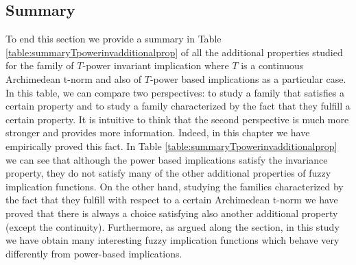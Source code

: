 \subsection{Summary}
To end this section we provide a summary in Table  \ref{table:summaryTpowerinvadditionalprop} of all the additional properties studied for the family of $T$-power invariant implication where $T$ is a continuous Archimedean t-norm and also of $T$-power based implications as a particular case. In this table, we can compare two perspectives: to study a family that satisfies a certain property and to study a family characterized by the fact that they fulfill a certain property. It is intuitive to think that the second perspective is much more stronger and provides more information. Indeed, in this chapter we have empirically proved this fact. In Table  \ref{table:summaryTpowerinvadditionalprop} we can see that although the power based implications satisfy the invariance property, they do not satisfy many of the other additional properties of fuzzy implication functions. On the other hand, studying the families characterized by the fact that they fulfill \PIT with respect to a certain Archimedean t-norm we have proved that there is always a choice satisfying also another additional property (except the continuity). Furthermore, as argued along the section, in this study we have obtain many interesting fuzzy implication functions which behave very differently from power-based implications. \enlargethispage{12pt}
